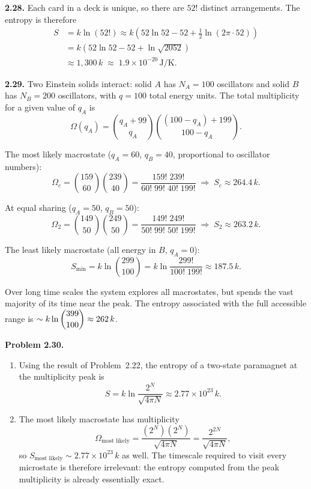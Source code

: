 \textbf{2.28.} Each card in a deck is unique, so there are $52!$ distinct arrangements. The
entropy is therefore
\begin{align*}
  S &= k\ln(52!) \approx k\!\left(52\ln 52 - 52 + \tfrac{1}{2}\ln(2\pi \cdot 52)\right) \\
    &= k\!\left(52\ln 52 - 52 + \ln\!\sqrt{2052}\right) \\
    &\approx 1{,}300\,k \;\approx\; 1.9 \times 10^{-20}\,\text{J/K}.
\end{align*}

\textbf{2.29.} Two Einstein solids interact: solid $A$ has $N_A = 100$ oscillators and solid $B$
has $N_B = 200$ oscillators, with $q = 100$ total energy units. The total multiplicity for a given
value of $q_A$ is
\[
  \Omega(q_A) = \binom{q_A + 99}{q_A}\binom{(100 - q_A) + 199}{100 - q_A}.
\]

The most likely macrostate ($q_A = 60$, $q_B = 40$, proportional to oscillator numbers):
\[
  \Omega_c = \binom{159}{60}\binom{239}{40} = \frac{159!\;239!}{60!\;99!\;40!\;199!}
  \;\Rightarrow\; S_c \approx 264.4\,k.
\]

At equal sharing ($q_A = 50$, $q_B = 50$):
\[
  \Omega_2 = \binom{149}{50}\binom{249}{50} = \frac{149!\;249!}{50!\;99!\;50!\;199!}
  \;\Rightarrow\; S_2 \approx 263.2\,k.
\]

The least likely macrostate (all energy in $B$, $q_A = 0$):
\[
  S_{\min} = k\ln\binom{299}{100} = k\ln\frac{299!}{100!\;199!} \approx 187.5\,k.
\]

Over long time scales the system explores all macrostates, but spends the vast majority of its
time near the peak. The entropy associated with the full accessible range is
$\sim k\ln\dbinom{399}{100} \approx 262\,k$.

\textbf{Problem 2.30.}
\begin{enumerate}
  \item[a)] Using the result of Problem~2.22, the entropy of a two-state paramagnet at the
  multiplicity peak is
  \[
    S = k\ln\!\frac{2^N}{\sqrt{4\pi N}} \approx 2.77\times10^{23}\,k.
  \]

  \item[b)] The most likely macrostate has multiplicity
  \[
    \Omega_{\text{most likely}} = \frac{(2^N)(2^N)}{\sqrt{4\pi N}} = \frac{2^{2N}}{\sqrt{4\pi N}},
  \]
  so $S_{\text{most likely}} \sim 2.77\times10^{23}\,k$ as well. The timescale required to
  visit every microstate is therefore irrelevant: the entropy computed from the peak multiplicity
  is already essentially exact.
\end{enumerate}

